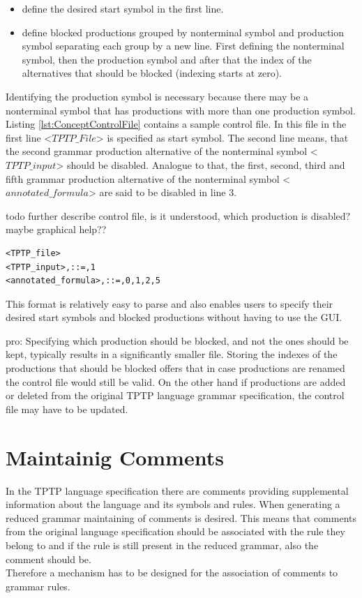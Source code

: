 \begin{itemize}%
	\item define the desired start symbol in the first line.
	\item define blocked productions grouped by nonterminal symbol and production symbol separating each group by a new line.
	First defining the nonterminal symbol, then the production symbol and after that the index of the alternatives that should be blocked (indexing starts at zero). 
\end{itemize}
\label{itemize:ConceptControlFile}
Identifying the production symbol is necessary because there may be a nonterminal symbol that has productions with more than one production symbol.\\
Listing \ref{lst:ConceptControlFile} contains a sample control file. In this file in the first line <$TPTP\_File$> is specified as start symbol.
The second line means, that the second grammar production alternative of the nonterminal symbol <$TPTP\_input$> should be disabled.
Analogue to that, the first, second, third and fifth grammar production alternative of the nonterminal symbol <$annotated\_formula$> are said to be disabled in line 3.

todo further describe control file, is it understood, which production is disabled? maybe graphical help??
\begin{lstlisting}[caption= Example of a control file,label= lst:ConceptControlFile]
<TPTP_file>
<TPTP_input>,::=,1
<annotated_formula>,::=,0,1,2,5
\end{lstlisting}
This format is relatively easy to parse and also enables users to specify their desired start symbols and blocked productions without having to use the GUI.

pro: Specifying which production should be blocked, and not the ones should be kept, typically results in a significantly smaller file.
Storing the indexes of the productions that should be blocked offers that in case productions are renamed the control file would still be valid. On the other hand if productions are added or deleted from the original \ac{TPTP} language grammar specification, the control file may have to be updated.


\section{Maintainig Comments}\label{sec:ConceptMaintainingComments}
In the \ac{TPTP} language specification there are comments providing supplemental information about the language and its symbols and rules.
When generating a reduced grammar maintaining of comments is desired. This means that comments from the original language specification should be associated with the rule they belong to and if the rule is still present in the reduced grammar, also the comment should be.\\
Therefore a mechanism has to be designed for the association of comments to grammar rules.

